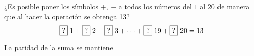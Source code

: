 \documentclass[11pt]{scrartcl}
\begin{document}
\begin{problem}

¿Es posible poner los símbolos $+$, $-$ a todos los números del $1$ al $20$ de manera
que al hacer la operación se obtenga 13?
\[ \boxed{?}\hspace{0.1cm}1+\boxed{?}\hspace{0.1cm}2+\boxed{?}\hspace{0.1cm}3+\cdots+\boxed{?}\hspace{0.1cm}19+\boxed{?}\hspace{0.1cm}20=13 \]

  \begin{hint}
  La paridad de la suma se mantiene
  \end{hint}
\end{problem}
\vspace{0.1cm}
\end{document}

